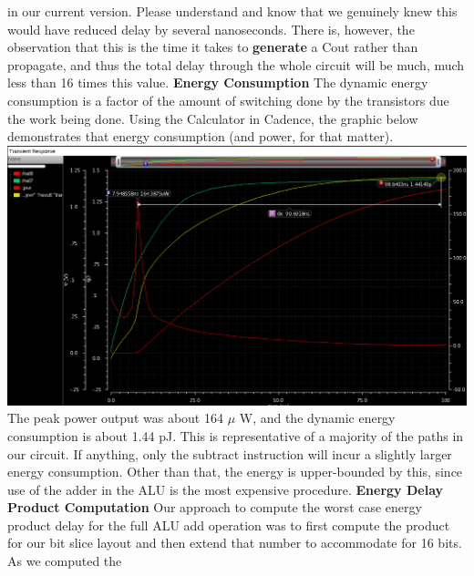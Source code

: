 \documentclass[12pt]{article}
\begin{document}
  in our current version. Please understand and know that we genuinely knew this would have reduced delay by
  several nanoseconds. There is, however, the observation that this is the time it takes to \textbf{generate} a Cout
  rather than propagate, and thus the total delay through the whole circuit will be much, much less than 16 times
  this value.
  \newline \newline
	\textbf{Energy Consumption}
  \newline \newline
  The dynamic energy consumption is a factor of the amount of switching done by the transistors due
  the work being done. Using the Calculator in Cadence, the graphic below demonstrates that energy 
  consumption (and power, for that matter).
  \newline \newline
  \includegraphics[scale=0.4]{energy.png} \\
  \newline \newline
  The peak power output was about 164 $\mu$ W, and the dynamic energy consumption is about 1.44 pJ.
  This is representative of a majority of the paths in our circuit. If anything, only the subtract
  instruction will incur a slightly larger energy consumption. Other than that, the energy is upper-bounded
  by this, since use of the adder in the ALU is the most expensive procedure.
    \newline \newline
	\textbf{Energy Delay Product Computation}
  \newline \newline
  Our approach to compute the worst case energy product delay for the full ALU add operation was to first compute
  the product for our bit slice layout and then extend that number to accommodate for 16 bits. As we computed the
\end{document}
